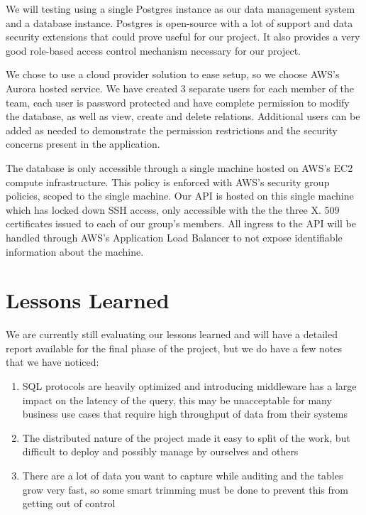 \documentclass[sigconf]{acmart}
\begin{document}
 We will testing using a single Postgres instance as our data management system and a database instance. Postgres is open-source with a lot of support and data security extensions that could prove useful for our project. It also provides a very good role-based access control mechanism necessary for our project.
 
 We chose to use a cloud provider solution to ease setup, so we choose AWS's Aurora hosted service. We have created 3 separate users for each member of the team, each user is password protected and have complete permission to modify the database, as well as view, create and delete relations. Additional users can be added as needed to demonstrate the permission restrictions and the security concerns present in the application.

The database is only accessible through a single machine hosted on AWS's EC2 compute infrastructure. This policy is enforced with AWS's security group policies, scoped to the single machine. Our API is hosted on this single machine which has locked down SSH access, only accessible with the the three X. 509 certificates issued to each of our group's members. All ingress to the API will be handled through AWS's Application Load Balancer to not expose identifiable information about the machine.

\section{Lessons Learned}

We are currently still evaluating our lessons learned and will  have a detailed report available for the final phase of the project, but we do  have a few notes that we have noticed:

\begin{enumerate}
    \item SQL protocols are heavily optimized and introducing middleware has a large impact on the latency of the query, this may be unacceptable for many business use cases that require high throughput of data from their systems
    \item The distributed nature of the project made it easy to split of the work, but difficult to deploy and possibly manage by ourselves and others
    \item There are a lot of data you want to capture while auditing and the tables grow very fast, so some smart trimming must be done to prevent this from getting out of control
\end{enumerate}
\end{document}
